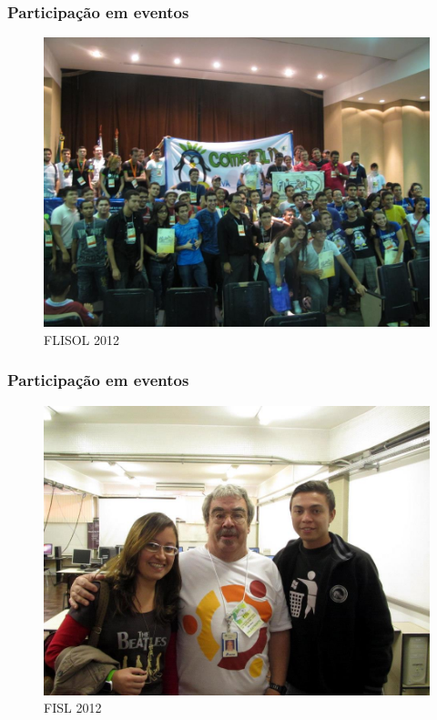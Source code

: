 \begin{frame}\frametitle{Participação em eventos}

\begin{figure}
   \includegraphics[scale=0.25]{img/atilacamurca-flisol-2012-3.jpg}
   \caption{FLISOL 2012}
\end{figure}

\end{frame}

\begin{frame}\frametitle{Participação em eventos}

\begin{figure}
   \includegraphics[scale=0.25]{img/darlildo-fisl-1.jpg}
   \caption{FISL 2012}
\end{figure}

\end{frame}

